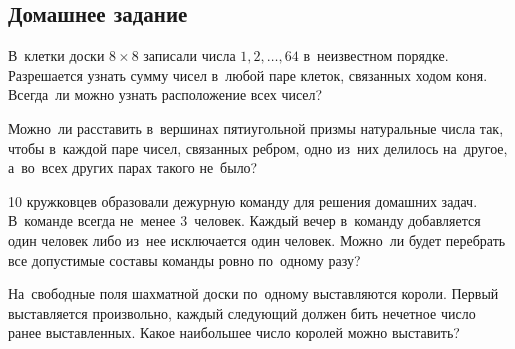 

\subsection*{Домашнее задание}



\begin{problems}

\item
В~клетки доски $8 \times 8$ записали числа $1, 2, \ldots, 64$ в~неизвестном
порядке.
Разрешается узнать сумму чисел в~любой паре клеток, связанных ходом коня.
Всегда~ли можно узнать расположение всех чисел?

\item
Можно~ли расставить в~вершинах пятиугольной призмы натуральные числа так, чтобы
в~каждой паре чисел, связанных ребром, одно из~них делилось на~другое,
а~во~всех других парах такого не~было?


\item
10 кружковцев образовали дежурную команду для решения домашних задач.
В~команде всегда не~менее 3~человек.
Каждый вечер в~команду добавляется один человек либо из~нее исключается один
человек.
Можно~ли будет перебрать все допустимые составы команды ровно по~одному разу?

\item
На~свободные поля шахматной доски по~одному выставляются короли.
Первый выставляется произвольно, каждый следующий должен бить нечетное число
ранее выставленных.
Какое наибольшее число королей можно выставить?

\end{problems}

